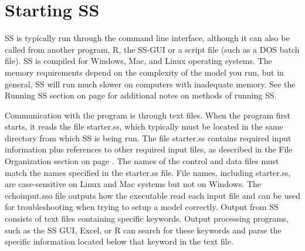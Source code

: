 \pagebreak
		
\section{Starting SS}
SS is typically run through the command line interface, although it can also be called from another program, R, the SS-GUI or a script file (such as a DOS batch file). SS is compiled for Windows, Mac, and Linux operating systems. The memory requirements depend on the complexity of the model you run, but in general, SS will run much slower on computers with inadequate memory. See the Running SS section on page \pageref{sec:RunningSS} for additional notes on methods of running SS.

Communication with the program is through text files.  When the program first starts, it reads the file starter.ss, which typically must be located in the same directory from which SS is being run.  The file starter.ss contains required input information plus references to other required input files, as described in the File Organization section on page \pageref{FileOrganization}.  The names of the control and data files must match the names specified in the starter.ss file.  File names, including starter.ss, are case-sensitive on Linux and Mac systems but not on Windows. The echoinput.sso file outputs how the executable read each input file and can be used for troubleshooting when trying to setup a model correctly.  Output from SS consists of text files containing specific keywords.  Output processing programs, such as the SS GUI, Excel, or R can search for these keywords and parse the specific information located below that keyword in the text file.

\pagebreak